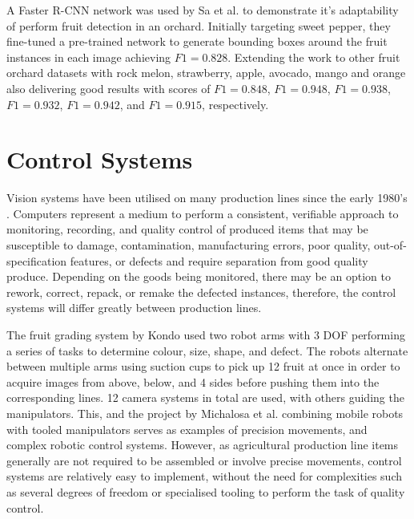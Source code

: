 \documentclass[fleqn,twoside,12pt]{report}
\begin{document}
   
A Faster R-CNN network was used by Sa et al.\cite{sa} to demonstrate it's adaptability of perform fruit detection in an orchard. Initially targeting sweet pepper, they fine-tuned a pre-trained network to generate bounding boxes around the fruit instances in each image achieving $F1=0.828$. Extending the work to other fruit orchard datasets with rock melon, strawberry, apple, avocado, mango and orange also delivering good results with scores of $F1=0.848$, $F1=0.948$, $F1=0.938$, $F1=0.932$, $F1=0.942$, and $F1=0.915$, respectively. 




\section{Control Systems}
\label{sec:control_sys}

Vision systems have been utilised on many production lines since the early 1980's \cite{kruger}. Computers represent a medium to perform a consistent, verifiable approach to monitoring, recording, and quality control of produced items that may be susceptible to damage, contamination, manufacturing errors, poor quality, out-of-specification features, or defects and require separation from good quality produce. Depending on the goods being monitored, there may be an option to rework, correct, repack, or remake the defected instances, therefore, the control systems will differ greatly between production lines.   

The fruit grading system by Kondo \cite{kondo} used two robot arms with 3 DOF performing a series of tasks to determine colour, size, shape, and defect. The robots alternate between multiple arms using suction cups to pick up 12 fruit at once in order to acquire images from above, below, and 4 sides before pushing them into the corresponding lines. 12 camera systems in total are used, with others guiding the manipulators. This, and the project by Michalosa et al.\cite{michalosa} combining mobile robots with tooled manipulators serves as examples of precision movements, and complex robotic control systems. However, as agricultural production line items generally are not required to be assembled or involve precise movements, control systems are relatively easy to implement, without the need for complexities such as several degrees of freedom or specialised tooling to perform the task of quality control.  
\end{document}
